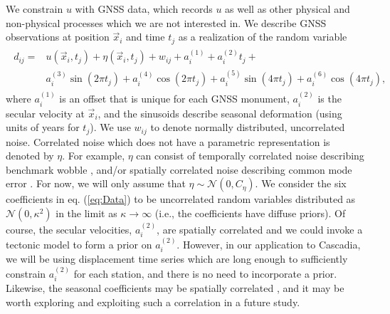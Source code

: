 \documentclass[10pt,letter]{article}
\begin{document}
We constrain $u$ with GNSS data, which records $u$ as well as other physical and non-physical processes which we are not interested in. We describe GNSS observations at position $\vec{x}_i$ and time $t_j$ as a realization of the random variable 
\begin{align}\label{eq:Data}
\begin{split}
d_{ij} = &u(\vec{x}_i,t_j) + \eta(\vec{x}_i,t_j) + w_{ij} + a^{(1)}_i + a^{(2)}_it_j + \\
         &a^{(3)}_i\sin(2 \pi t_j) + a^{(4)}_i\cos(2 \pi t_j) + a^{(5)}_i\sin(4 \pi t_j) + a^{(6)}_i\cos(4 \pi t_j), 
\end{split}
\end{align}
where $a^{(1)}_{i}$ is an offset that is unique for each GNSS monument, $a^{(2)}_{i}$ is the secular velocity at $\vec{x}_i$, and the sinusoids describe seasonal deformation (using units of years for $t_j$). We use $w_{ij}$ to denote normally distributed, uncorrelated noise. Correlated noise which does not have a parametric representation is denoted by $\eta$.  For example, $\eta$ can consist of temporally correlated noise describing benchmark wobble \citep[e.g.,][]{Wyatt1982,Wyatt1989}, and/or spatially correlated noise describing common mode error \citep[e.g.,][]{Wdowinski1997}. For now, we will only assume that $\eta \sim \mathcal{N}(0,C_\eta)$. We consider the six coefficients in eq. (\ref{eq:Data}) to be uncorrelated random variables distributed as $\mathcal{N}(0,\kappa^2)$ in the limit as $\kappa \to \infty$ (i.e., the coefficients have diffuse priors). Of course, the secular velocities, $a^{(2)}_{i}$, are spatially correlated and we could invoke a tectonic model to form a prior on $a^{(2)}_{i}$. However, in our application to Cascadia, we will be using displacement time series which are long enough to sufficiently constrain $a^{(2)}_{i}$ for each station, and there is no need to incorporate a prior. Likewise, the seasonal coefficients may be spatially correlated \citep{Langbein2008}, and it may be worth exploring and exploiting such a correlation in a future study. 
\end{document}
